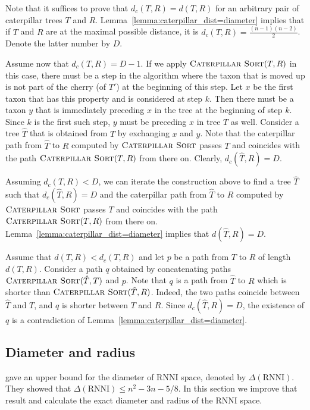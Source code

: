 \documentclass{amsart}
\newcommand{\rnni}{\mathrm{RNNI}}
\newcommand{\csort}{\textsc{Caterpillar Sort}}
\begin{document}
\proof
Note that it suffices to prove that $d_c(T, R) = d(T, R)$ for an arbitrary pair of caterpillar trees $T$ and $R$.
Lemma~\ref{lemma:caterpillar_dist=diameter} implies that if $T$ and $R$ are at the maximal possible distance, it is $d_c(T, R) = \frac{(n-1)(n-2)}{2}$.
Denote the latter number by $D$.

Assume now that $d_c(T, R) = D - 1$.
If we apply $\csort(T, R)$ in this case, there must be a step in the algorithm where the taxon that is moved up is not part of the cherry (of $T'$) at the beginning of this step.
Let $x$ be the first taxon that has this property and is considered at step $k$.
Then there must be a taxon $y$ that is immediately preceding $x$ in the tree at the beginning of step $k$.
Since $k$ is the first such step, $y$ must be preceding $x$ in tree $T$ as well.
Consider a tree $\hat T$ that is obtained from $T$ by exchanging $x$ and $y$.
Note that the caterpillar path from $\hat T$ to $R$ computed by $\csort$ passes $T$ and coincides with the path $\csort(T, R)$ from there on.
Clearly, $d_c(\hat T, R) = D$.

Assuming $d_c(T, R) < D$, we can iterate the construction above to find a tree $\hat T$ such that $d_c(\hat T, R) = D$ and the caterpillar path from $\hat T$ to $R$ computed by $\csort$ passes $T$ and coincides with the path $\csort(T, R)$ from there on.
Lemma~\ref{lemma:caterpillar_dist=diameter} implies that $d(\hat T, R) = D$.

Assume that $d(T, R) < d_c(T, R)$ and let $p$ be a path from $T$ to $R$ of length $d(T, R)$.
Consider a path $q$ obtained by concatenating paths $\csort(\hat T, T)$ and $p$.
Note that $q$ is a path from $\hat T$ to $R$ which is shorter than $\csort(\hat T, R)$.
Indeed, the two paths coincide between $\hat T$ and $T$, and $q$ is shorter between $T$ and $R$.
Since $d_c(\hat T, R) = D$, the existence of $q$ is a contradiction of Lemma~\ref{lemma:caterpillar_dist=diameter}.
\endproof


\subsection{Diameter and radius}
\label{section:diameter}

\textcite[Theorem~7]{Gavryushkin2018-ol} gave an upper bound for the diameter of $\rnni$ space, denoted by $\Delta(\rnni)$.
They showed that $\Delta(\rnni) \leq n^2 - 3n - 5/8$.
In this section we improve that result and calculate the exact diameter and radius of the $\rnni$ space.
\end{document}
